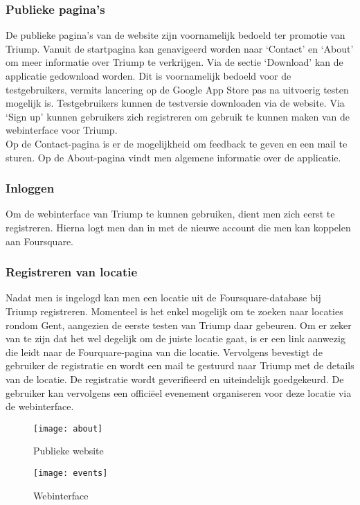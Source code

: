 \subsubsection{Publieke pagina's}
De publieke pagina's van de website zijn voornamelijk bedoeld ter promotie van Triump. Vanuit de startpagina kan genavigeerd worden naar `Contact' en `About' om meer informatie over Triump te verkrijgen. Via de sectie `Download' kan de applicatie gedownload worden. Dit is voornamelijk bedoeld voor de testgebruikers, vermits lancering op de Google App Store pas na uitvoerig testen mogelijk is. Testgebruikers kunnen de testversie downloaden via de website. Via `Sign up' kunnen gebruikers zich registreren om gebruik te kunnen maken van de webinterface voor Triump.\\
Op de Contact-pagina is er de mogelijkheid om feedback te geven en een mail te sturen.
Op de About-pagina vindt men algemene informatie over de applicatie.
\subsubsection{Inloggen}
Om de webinterface van Triump te kunnen gebruiken, dient men zich eerst te registreren. Hierna logt men dan in met de nieuwe account die men kan koppelen aan Foursquare.
\subsubsection{Registreren van locatie}
Nadat men is ingelogd kan men een locatie uit de Foursquare-database bij Triump registreren.
Momenteel is het enkel mogelijk om te zoeken naar locaties rondom Gent, aangezien de eerste testen van Triump daar gebeuren.
Om er zeker van te zijn dat het wel degelijk om de juiste locatie gaat, is er een link aanwezig die leidt naar de Fourquare-pagina van die locatie.
Vervolgens bevestigt de gebruiker de registratie en wordt een mail te gestuurd naar Triump met de details van de locatie. De registratie wordt geverifieerd en uiteindelijk goedgekeurd.
De gebruiker kan vervolgens een officiëel evenement organiseren voor deze locatie via de webinterface.
\begin{figure}[H]
	\centering
	\texttt{[image: about]}
	\caption{Publieke website }
	\label{fig:about}
\end{figure}

\begin{figure}[H]
	\centering
	\texttt{[image: events]}
	\caption{Webinterface }
	\label{fig:events}
\end{figure}

